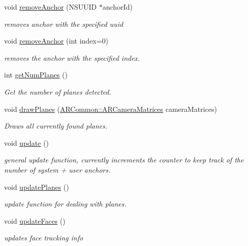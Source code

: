 \begin{DoxyCompactItemize}
void \hyperlink{class_a_r_core_1_1_a_r_anchor_manager_a28ed88e530bc1991e59f26e6b580d5c5}{remove\+Anchor} (N\+S\+U\+U\+ID $\ast$anchor\+Id)
\begin{DoxyCompactList}\small\item\em removes anchor with the specified uuid \end{DoxyCompactList}\item 
void \hyperlink{class_a_r_core_1_1_a_r_anchor_manager_a471d6e5694d6aecb810b65a909cf72b1}{remove\+Anchor} (int index=0)
\begin{DoxyCompactList}\small\item\em removes the anchor with the specified index. \end{DoxyCompactList}\item 
int \hyperlink{class_a_r_core_1_1_a_r_anchor_manager_a1da3445edbf4474d1207d30b691cfb4f}{get\+Num\+Planes} ()
\begin{DoxyCompactList}\small\item\em Get the number of planes detected. \end{DoxyCompactList}\item 
void \hyperlink{class_a_r_core_1_1_a_r_anchor_manager_a7ec2178e8754fa04b00cc600c60cb852}{draw\+Planes} (\hyperlink{struct_a_r_common_1_1_a_r_camera_matrices}{A\+R\+Common\+::\+A\+R\+Camera\+Matrices} camera\+Matrices)
\begin{DoxyCompactList}\small\item\em Draws all currently found planes. \end{DoxyCompactList}\item 
void \hyperlink{class_a_r_core_1_1_a_r_anchor_manager_af4b19656d608761d25661d6720a4c2f3}{update} ()
\begin{DoxyCompactList}\small\item\em general update function, currently increments the counter to keep track of the number of system + user anchors. \end{DoxyCompactList}\item 
void \hyperlink{class_a_r_core_1_1_a_r_anchor_manager_aa35c3487e0ba5980ff6b2fb43414bd57}{update\+Planes} ()
\begin{DoxyCompactList}\small\item\em update function for dealing with planes. \end{DoxyCompactList}\item 
void \hyperlink{class_a_r_core_1_1_a_r_anchor_manager_a7148268b0a3e575bdad9e0d60dba505c}{update\+Faces} ()
\begin{DoxyCompactList}\small\item\em updates face tracking info \end{DoxyCompactList}\item 

\end{DoxyCompactItemize}

